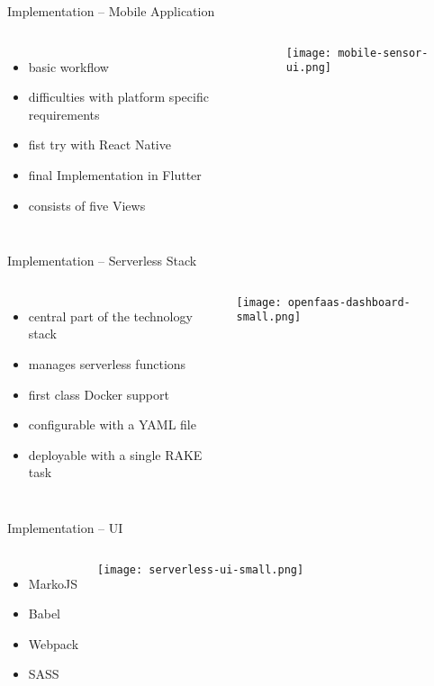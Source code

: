 \documentclass[aspectratio=169]{beamer}
\begin{document}
  \begin{frame}{Implementation -- Mobile Application}
    \begin{columns}
        \begin{itemize}
          \item basic workflow
          \item difficulties with platform specific requirements
          \item fist try with React Native
          \item final Implementation in Flutter
          \item consists of five Views
        \end{itemize}
        \vfill
        \centering
        \texttt{[image: mobile-sensor-ui.png]}
     \end{columns}
  \end{frame}

  \begin{frame}{Implementation -- Serverless Stack}
    \begin{columns}
        \begin{itemize}
          \item central part of the technology stack
          \item manages serverless functions
          \item first class Docker support
          \item configurable with a YAML file
          \item deployable with a single RAKE task
        \end{itemize}
        \vfill
        \centering
        \texttt{[image: openfaas-dashboard-small.png]}
     \end{columns}
  \end{frame}

  \begin{frame}{Implementation -- UI}
    \begin{columns}
        \begin{itemize}
          \item MarkoJS
          \item Babel
          \item Webpack
          \item SASS
        \end{itemize}
        \vfill
        \centering
        \texttt{[image: serverless-ui-small.png]}
     \end{columns}
  \end{frame}
\end{document}
